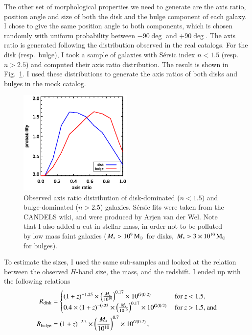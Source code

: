 \documentclass[12pt,a4paper]{article}
\newcommand{\rfig}[1]{Fig.~\ref{#1}}
\newcommand{\msun}{{\rm M}_\odot}
\newcommand{\mstar}{M_\ast}
\begin{document}
The other set of morphological properties we need to generate are the axis ratio, position angle and size of both the disk and the bulge component of each galaxy. I chose to give the same position angle to both components, which is chosen randomly with uniform probability between $-90\deg$ and $+90\deg$. The axis ratio is generated following the distribution observed in the real catalogs. For the disk (resp.~bulge), I took a sample of galaxies with S\'ersic index $n<1.5$ (resp.~$n>2.5$) and computed their axis ratio distribution. The result is shown in \rfig{FIG:axis_ratio}. I used these distributions to generate the axis ratios of both disks and bulges in the mock catalog.

\begin{figure}
\includegraphics[width=0.5\textwidth]{axis_ratio}
\caption{\label{FIG:axis_ratio} Observed axis ratio distribution of disk-dominated ($n<1.5$) and bulge-dominated ($n>2.5$) galaxies. S\'ersic fits were taken from the CANDELS wiki, and were produced by Arjen van der Wel. Note that I also added a cut in stellar mass, in order not to be polluted by low mass faint galaxies ($\mstar > 10^{9}\,\msun$ for disks, $\mstar > 3\times10^{10}\,\msun$ for bulges).}
\end{figure}

To estimate the sizes, I used the same sub-samples and looked at the relation between the observed $H$-band size, the mass, and the redshift. I ended up with the following relations
\begin{align}
R_{\rm disk} &= \begin{cases}
(1+z)^{-1.25} \times \left(\frac{\mstar}{10^{10}}\right)^{0.17} \times 10^{G(0.2)}\,&\text{for $z < 1.5$,} \\
0.4 \times (1+z)^{-0.25} \times \left(\frac{\mstar}{10^{10}}\right)^{0.17} \times 10^{G(0.2)}\,&\text{for $z > 1.5$, and}
\end{cases} \\
R_{\rm bulge} &= (1+z)^{-2.5} \times \left(\frac{\mstar}{10^{10}}\right)^{0.7} \times 10^{G(0.2)}\,,
\end{align}
\end{document}
